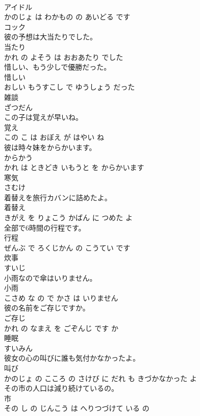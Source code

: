 \documentclass[8pt]{extreport}
\begin{document}
\begin{CJK}{UTF8}{min}
\\	アイドル 
\\	かのじょ は わかもの の あいどる です			
\\	コック	
\\	彼の予想は大当たりでした。	
\\	当たり 
\\	かれ の よそう は おおあたり でした			
\\	惜しい、もう少しで優勝だった。	
\\	惜しい 
\\	おしい もうすこし で ゆうしょう だった			
\\	雑談	
\\	ざつだん		
\\	この子は覚えが早いね。	
\\	覚え 
\\	この こ は おぼえ が はやい ね			
\\	彼は時々妹をからかいます。	
\\	からかう 
\\	かれ は ときどき いもうと を からかいます			
\\	寒気	
\\	さむけ		
\\	着替えを旅行カバンに詰めたよ。	
\\	着替え 
\\	きがえ を りょこう かばん に つめた よ			
\\	全部で6時間の行程です。	
\\	行程 
\\	ぜんぶ で ろくじかん の こうてい です			
\\	炊事	
\\	すいじ		
\\	小雨なので傘はいりません。	
\\	小雨 
\\	こさめ な の で かさ は いりません			
\\	彼の名前をご存じですか。	
\\	ご存じ 
\\	かれ の なまえ を ごぞんじ です か			
\\	睡眠	
\\	すいみん		
\\	彼女の心の叫びに誰も気付かなかったよ。	
\\	叫び 
\\	かのじょ の こころ の さけび に だれ も きづかなかった よ			
\\	その市の人口は減り続けているの。	
\\	市 
\\	その し の じんこう は へりつづけて いる の			

\end{CJK}
\end{document}
